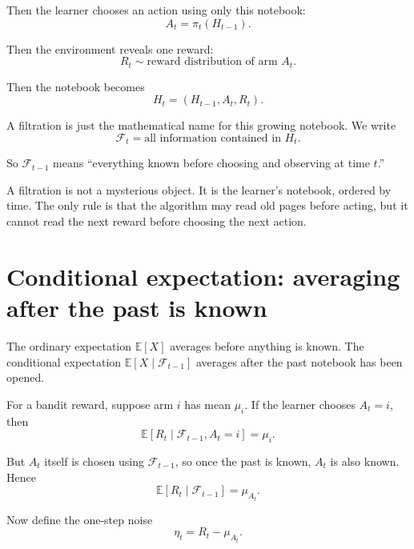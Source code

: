 \documentclass[en,nofont,11pt]{elegantbook}
\newcommand{\E}{\mathbb{E}}
\newcommand{\F}{\mathcal{F}}
\begin{document}
Then the learner chooses an action using only this notebook:
\begin{equation}
A_t = \pi_t(H_{t-1}).
\end{equation}

Then the environment reveals one reward:
\begin{equation}
R_t \sim \text{reward distribution of arm }A_t.
\end{equation}

Then the notebook becomes
\begin{equation}
H_t=(H_{t-1},A_t,R_t).
\end{equation}

A filtration is just the mathematical name for this growing notebook.  We write
\begin{equation}
\F_t = \text{all information contained in }H_t.
\end{equation}

So $\F_{t-1}$ means ``everything known before choosing and observing at time $t$.''

\begin{keyidea}
A filtration is not a mysterious object.  It is the learner's notebook, ordered by time.  The only rule is that the algorithm may read old pages before acting, but it cannot read the next reward before choosing the next action.
\end{keyidea}

\chapter{Conditional expectation: averaging after the past is known}

The ordinary expectation $\E[X]$ averages before anything is known.  The conditional expectation $\E[X\mid \F_{t-1}]$ averages after the past notebook has been opened.

For a bandit reward, suppose arm $i$ has mean $\mu_i$.  If the learner chooses $A_t=i$, then
\begin{equation}
\E[R_t \mid \F_{t-1}, A_t=i] = \mu_i.
\end{equation}

But $A_t$ itself is chosen using $\F_{t-1}$, so once the past is known, $A_t$ is also known.  Hence
\begin{equation}
\E[R_t \mid \F_{t-1}] = \mu_{A_t}. \label{eq:conditional_reward_mean}
\end{equation}

Now define the one-step noise
\begin{equation}
\eta_t = R_t - \mu_{A_t}.
\end{equation}
\end{document}
